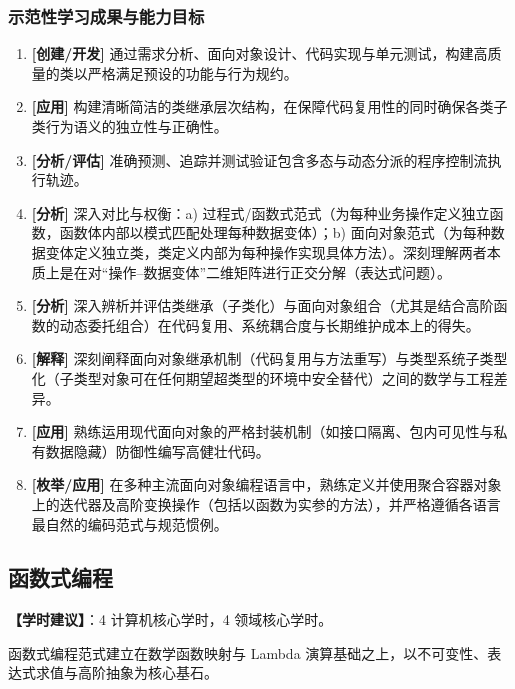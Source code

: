 \subsubsection{示范性学习成果与能力目标}
\begin{enumerate}
    \item \textbf{[创建/开发]} 通过需求分析、面向对象设计、代码实现与单元测试，构建高质量的类以严格满足预设的功能与行为规约。
    \item \textbf{[应用]} 构建清晰简洁的类继承层次结构，在保障代码复用性的同时确保各类子类行为语义的独立性与正确性。
    \item \textbf{[分析/评估]} 准确预测、追踪并测试验证包含多态与动态分派的程序控制流执行轨迹。
    \item \textbf{[分析]} 深入对比与权衡：a) 过程式/函数式范式（为每种业务操作定义独立函数，函数体内部以模式匹配处理每种数据变体）；b) 面向对象范式（为每种数据变体定义独立类，类定义内部为每种操作实现具体方法）。深刻理解两者本质上是在对“操作--数据变体”二维矩阵进行正交分解（表达式问题）。
    \item \textbf{[分析]} 深入辨析并评估类继承（子类化）与面向对象组合（尤其是结合高阶函数的动态委托组合）在代码复用、系统耦合度与长期维护成本上的得失。
    \item \textbf{[解释]} 深刻阐释面向对象继承机制（代码复用与方法重写）与类型系统子类型化（子类型对象可在任何期望超类型的环境中安全替代）之间的数学与工程差异。
    \item \textbf{[应用]} 熟练运用现代面向对象的严格封装机制（如接口隔离、包内可见性与私有数据隐藏）防御性编写高健壮代码。
    \item \textbf{[枚举/应用]} 在多种主流面向对象编程语言中，熟练定义并使用聚合容器对象上的迭代器及高阶变换操作（包括以函数为实参的方法），并严格遵循各语言最自然的编码范式与规范惯例。
\end{enumerate}

\subsection{函数式编程}
\textbf{【学时建议】}：4 计算机核心学时，4 领域核心学时。

函数式编程范式建立在数学函数映射与 Lambda 演算基础之上，以不可变性、表达式求值与高阶抽象为核心基石。

